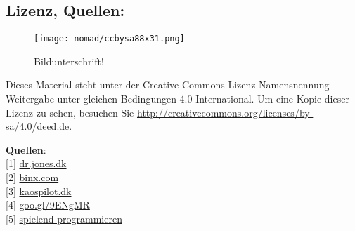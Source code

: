 \subsection*{Lizenz, Quellen:}

\begin{wrapfigure}{l}{2.0cm}
\texttt{[image: nomad/ccbysa88x31.png]}
\caption{Bildunterschrift!}
\end{wrapfigure}
Dieses Material steht unter der Creative-Commons-Lizenz Namensnennung - Weitergabe unter gleichen Bedingungen 4.0 International. Um eine Kopie dieser Lizenz zu sehen, besuchen Sie \url{http://creativecommons.org/licenses/by-sa/4.0/deed.de}.

\textbf{Quellen}: \\
{[}1{]} \href{http://dr.jones.dk}{dr.jones.dk} \\
{[}2{]} \href{http://binx.com/}{binx.com} \\
{[}3{]} \href{http://kaospilot.dk/}{kaospilot.dk} \\
{[}4{]} \href{http://goo.gl/9ENgMR}{goo.gl/9ENgMR} \\ %
{[}5{]} \href{http://spielend-programmieren.at}{spielend-programmieren}
